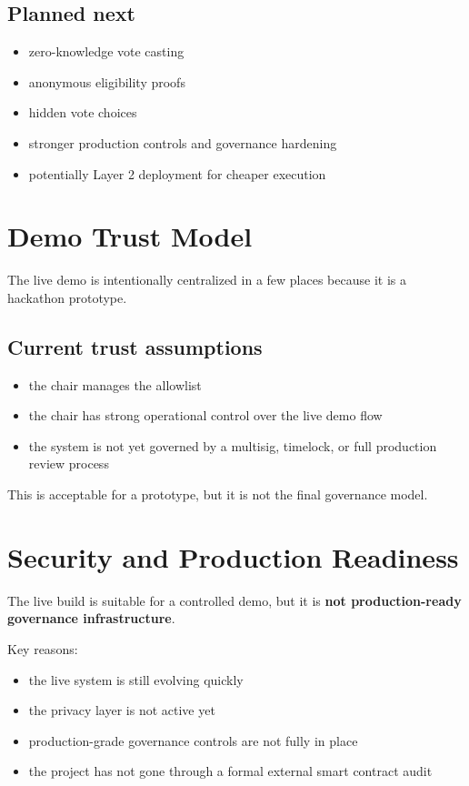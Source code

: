 \documentclass[12pt]{article}
\begin{document}
\subsection{Planned next}
\begin{itemize}
    \item zero-knowledge vote casting
    \item anonymous eligibility proofs
    \item hidden vote choices
    \item stronger production controls and governance hardening
    \item potentially Layer 2 deployment for cheaper execution
\end{itemize}

\section{Demo Trust Model}

The live demo is intentionally centralized in a few places because it is a hackathon prototype.

\subsection*{Current trust assumptions}
\begin{itemize}
    \item the chair manages the allowlist
    \item the chair has strong operational control over the live demo flow
    \item the system is not yet governed by a multisig, timelock, or full production review process
\end{itemize}

This is acceptable for a prototype, but it is not the final governance model.

\section{Security and Production Readiness}

The live build is suitable for a controlled demo, but it is \textbf{not production-ready governance infrastructure}.

Key reasons:
\begin{itemize}
    \item the live system is still evolving quickly
    \item the privacy layer is not active yet
    \item production-grade governance controls are not fully in place
    \item the project has not gone through a formal external smart contract audit
\end{itemize}
\end{document}
